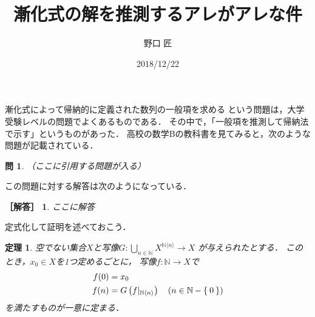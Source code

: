 \documentclass[11pt,a4paper]{ltjsarticle} %
\title{漸化式の解を推測するアレがアレな件}
\author{野口 匠}
\date{2018/12/22}
\theoremstyle{mystyle} %
\newtheorem{thm}{定理} %
\newtheorem{que}{問} %
\newtheorem*{ans}{［解答］} %
\begin{document}
%
\maketitle
%
漸化式によって帰納的に定義された数列の一般項を求める
という問題は，大学受験レベルの問題でよくあるものである．
その中で，「一般項を推測して帰納法で示す」というものがあった．
高校の数学Bの教科書を見てみると，次のような問題が記載されている．
\begin{que} \label{que:suisoku}
  （ここに引用する問題が入る）
\end{que}
この問題に対する解答は次のようになっている．
\begin{ans}
  ここに解答
\end{ans}

定式化して証明を述べておこう．
\begin{thm} \label{thm:inddef}
  空でない集合$X$と写像$G \colon \bigcup_{n \in \mathbb{N}} 
  X^{\mathbb{N} \langle n \rangle} \longrightarrow X$
  が与えられたとする．
  このとき，$x_0 \in X$を1つ定めるごとに，
  写像$f \colon \mathbb{N} \longrightarrow X$で
  \begin{align}
    \begin{aligned}
      f(0) & = x_0 \\
      f(n) & = G \left( f|_{\mathbb{N} \langle n \rangle} \right)
      \quad ( n \in \mathbb{N} - \Set{0} )
    \end{aligned}
    \label{eq:inddef}
  \end{align}
  を満たすものが一意に定まる．
\end{thm}
\end{document}
